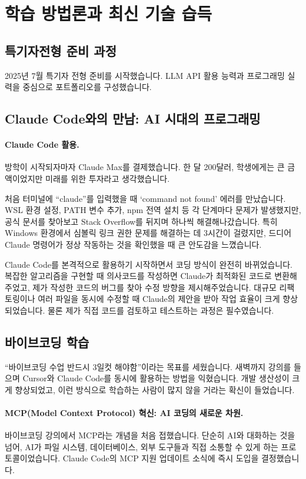 \section{학습 방법론과 최신 기술 습득}

\subsection{특기자전형 준비 과정}
2025년 7월 특기자 전형 준비를 시작했습니다. LLM API 활용 능력과 프로그래밍 실력을 중심으로 포트폴리오를 구성했습니다.

\subsection{Claude Code와의 만남: AI 시대의 프로그래밍}

\paragraph{Claude Code 활용.}
방학이 시작되자마자 Claude Max를 결제했습니다. 한 달 200달러, 학생에게는 큰 금액이었지만 미래를 위한 투자라고 생각했습니다. 

처음 터미널에 ``claude''를 입력했을 때 `command not found' 에러를 만났습니다. WSL 환경 설정, PATH 변수 추가, npm 전역 설치 등 각 단계마다 문제가 발생했지만, 공식 문서를 찾아보고 Stack Overflow를 뒤지며 하나씩 해결해나갔습니다. 특히 Windows 환경에서 심볼릭 링크 권한 문제를 해결하는 데 3시간이 걸렸지만, 드디어 Claude 명령어가 정상 작동하는 것을 확인했을 때 큰 안도감을 느꼈습니다.

Claude Code를 본격적으로 활용하기 시작하면서 코딩 방식이 완전히 바뀌었습니다. 복잡한 알고리즘을 구현할 때 의사코드를 작성하면 Claude가 최적화된 코드로 변환해주었고, 제가 작성한 코드의 버그를 찾아 수정 방향을 제시해주었습니다. 대규모 리팩토링이나 여러 파일을 동시에 수정할 때 Claude의 제안을 받아 작업 효율이 크게 향상되었습니다. 물론 제가 직접 코드를 검토하고 테스트하는 과정은 필수였습니다.

\subsection{바이브코딩 학습}
``바이브코딩 수업 반드시 3일컷 해야함''이라는 목표를 세웠습니다. 새벽까지 강의를 들으며 Cursor와 Claude Code를 동시에 활용하는 방법을 익혔습니다. 개발 생산성이 크게 향상되었고, 이런 방식으로 학습하는 사람이 많지 않을 거라는 확신이 들었습니다.

\paragraph{MCP(Model Context Protocol) 혁신: AI 코딩의 새로운 차원.}
바이브코딩 강의에서 MCP라는 개념을 처음 접했습니다. 단순히 AI와 대화하는 것을 넘어, AI가 파일 시스템, 데이터베이스, 외부 도구들과 직접 소통할 수 있게 하는 프로토콜이었습니다. Claude Code의 MCP 지원 업데이트 소식에 즉시 도입을 결정했습니다.

